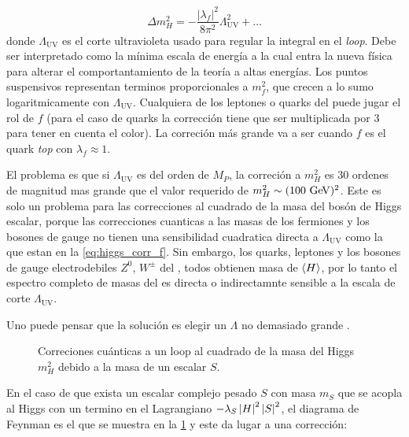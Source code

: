\begin{equation}
  \Delta m_H^2 = -\frac{|\lambda_f|^2}{8\pi^2} \Lambda^2_\text{UV} + \ldots
  \label{eq:higgs_corr_f}
\end{equation}
%
donde $\Lambda_\text{UV}$ es el corte ultravioleta usado para regular la integral en el \emph{loop}.
Debe ser interpretado como la m\'inima escala de energ\'ia a la cual entra la nueva física para
alterar el comportantamiento de la teoría a altas energías. Los puntos suspensivos representan
terminos proporcionales a $m_f^2$, que crecen a lo sumo logaritmicamente con $\Lambda_\text{UV}$.
Cualquiera de los leptones o quarks del {\SM} puede jugar el rol de $f$ (para el caso de quarks
la correcci\'on tiene que ser multiplicada por 3 para tener en cuenta el color).
La correci\'on m\'as grande va a ser cuando $f$ es el quark \emph{top} con $\lambda_f \approx 1$.

El problema es que si $\Lambda_\text{UV}$ es del orden de $M_P$, la correci\'on a $m_H^2$ es
30 ordenes de magnitud mas grande que el valor requerido de $m_H^2 \sim (100 \gev)^2$.
Este es solo un problema para las correcciones al cuadrado de la masa del bos\'on de Higgs escalar,
porque las correcciones cuanticas a las masas de los fermiones y los bosones de gauge no tienen una sensibilidad
cuadratica directa a $\Lambda_\text{UV}$ como la que estan en la {\eq} \eqref{eq:higgs_corr_f}. Sin embargo, los quarks, leptones
y los bosones de gauge electrodebiles $Z^0$, $W^{\pm}$ del {\SM}, todos obtienen masa de $\langle H \rangle$, por lo
tanto el espectro completo de masas del {\SM} es directa o indirectamnte sensible a la escala de corte
$\Lambda_\text{UV}$.

Uno puede pensar que la soluci\'on es elegir un $\Lambda$ no demasiado grande .

\begin{figure}[h]

  \centering

  

  \caption{Correciones cu\'anticas a un loop al cuadrado de la masa del Higgs $m_H^2$ debido a la
    masa de un escalar $S$.}\label{fig:higgs_correction_s}
\end{figure}

En el caso de que exista un escalar complejo pesado $S$ con masa $m_S$ que se acopla al Higgs con un
termino en el Lagrangiano $-\lambda_S \left| H \right|^2 \left| S \right|^2$, el diagrama de Feynman es el que se muestra
en la {\fig} \ref{fig:higgs_correction_s} y este da lugar a una correcci\'on:

